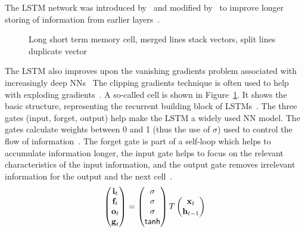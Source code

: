 The \ac{LSTM} network was introduced by~\cite{hochreiter_long_1997} and modified
by~\cite{gers_learning_1999} to improve longer storing of information from earlier
layers~\citep{chauhan_review_2018}.
\begin{figure}[ht]
    \centering
    
    \caption[Long short term memoory cell]{%
        Long short term memory cell, merged lines stack vectors, split lines duplicate
        vector~\citep{goodfellow_deep_2016,yu_review_2019}\label{fig:lstm}
    }
\end{figure}
The \ac{LSTM} also improves upon the vanishing gradients problem associated with
increasingly deep \acp{NN}~\citep{sherstinsky_fundamentals_2020}
The clipping gradients technique is often used to help with exploding
gradients~\citep{goodfellow_deep_2016}.
A so-called cell is shown in Figure~\ref{fig:lstm}.
It shows the basic structure, representing the recurrent building block of
\acp{LSTM}~\citep{goodfellow_deep_2016}.
The three gates (input, forget, output) help make the \ac{LSTM} a widely used \ac{NN} model.
The gates calculate weights between 0 and 1 (thus the use of $\sigma$) used to control
the flow of information~\citep{goodfellow_deep_2016}.
The forget gate is part of a self-loop which helps to accumulate information longer, the input
gate helps to focus on the relevant characteristics of the input information,
and the output gate removes irrelevant information for the output and the next
cell~\citep{goodfellow_deep_2016}.
\begin{equation}\label{eq:lstm-gates}
    \begin{pmatrix}
        \textbf{i}_t \\
        \textbf{f}_t \\
        \textbf{o}_t \\
        \textbf{g}_t
    \end{pmatrix}
    =
    \begin{pmatrix}
        \sigma \\
        \sigma \\
        \sigma \\
        \textsf{tanh}
    \end{pmatrix}
    T
    \begin{pmatrix}
        \textbf{x}_{t} \\
        \textbf{h}_{t-1}
    \end{pmatrix}
\end{equation}
